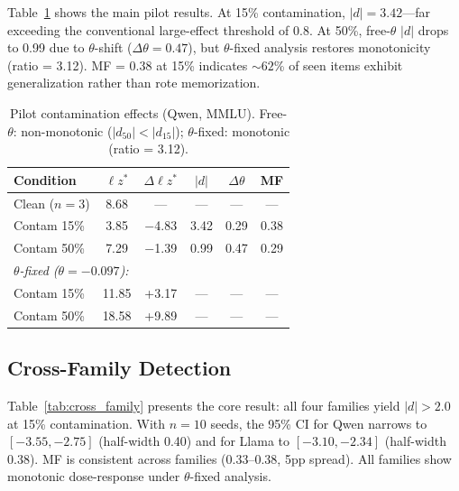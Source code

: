 \documentclass[11pt,a4paper]{article}
\begin{document}
Table~\ref{tab:pilot_contam} shows the main pilot results.
At 15\% contamination, $|d| = 3.42$---far exceeding the conventional large-effect threshold of 0.8.
At 50\%, free-$\theta$ $|d|$ drops to 0.99 due to $\theta$-shift ($\Delta\theta = 0.47$), but $\theta$-fixed analysis restores monotonicity (ratio = 3.12).
MF = 0.38 at 15\% indicates ${\sim}62$\% of seen items exhibit generalization rather than rote memorization.

\begin{table}[h]
\centering
\small
\begin{tabular}{lccccc}
\toprule
Condition & $\ell z^*$ & $\Delta \ell z^*$ & $|d|$ & $\Delta\theta$ & MF \\
\midrule
Clean ($n{=}3$) & 8.68 & --- & --- & --- & --- \\
Contam 15\% & 3.85 & $-$4.83 & 3.42 & 0.29 & 0.38 \\
Contam 50\% & 7.29 & $-$1.39 & 0.99 & 0.47 & 0.29 \\
\midrule
\multicolumn{6}{l}{\textit{$\theta$-fixed ($\theta = -0.097$):}} \\
Contam 15\% & 11.85 & +3.17 & --- & --- & --- \\
Contam 50\% & 18.58 & +9.89 & --- & --- & --- \\
\bottomrule
\end{tabular}
\caption{Pilot contamination effects (Qwen, MMLU). Free-$\theta$: non-monotonic ($|d_{50}| < |d_{15}|$); $\theta$-fixed: monotonic (ratio = 3.12).}
\label{tab:pilot_contam}
\end{table}

\subsection{Cross-Family Detection}
\label{sec:cross_family}

Table~\ref{tab:cross_family} presents the core result: all four families yield $|d| > 2.0$ at 15\% contamination.
With $n{=}10$ seeds, the 95\% CI for Qwen narrows to $[-3.55, -2.75]$ (half-width 0.40) and for Llama to $[-3.10, -2.34]$ (half-width 0.38).
MF is consistent across families (0.33--0.38, 5pp spread).
All families show monotonic dose-response under $\theta$-fixed analysis.
\end{document}
